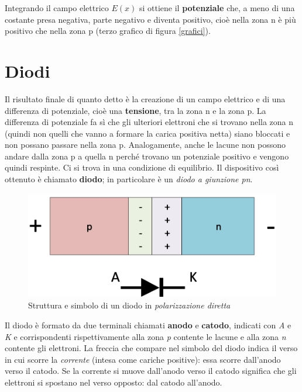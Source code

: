 \documentclass[12pt, a4paper]{report}
\begin{document}
Integrando il campo elettrico $E(x)$ si ottiene il \textbf{potenziale} che, a meno di una costante presa negativa, parte negativo e diventa positivo, cioè nella zona n è più positivo che nella zona p (terzo grafico di figura \ref{grafici}).

\section{Diodi}
Il risultato finale di quanto detto è la creazione di un campo elettrico e di una differenza di potenziale, cioè una \textbf{tensione}, tra la zona n e la zona p. La differenza di potenziale fa sì che gli ulteriori elettroni che si trovano nella zona n (quindi non quelli che vanno a formare la carica positiva netta) siano bloccati e non possano passare nella zona p. Analogamente, anche le lacune non possono andare dalla zona p a quella n perché trovano un potenziale positivo e vengono quindi respinte. Ci si trova in una condizione di equilibrio. Il dispositivo così ottenuto è chiamato \textbf{diodo}; in particolare è un \textit{diodo a giunzione pn}.
\begin{figure}[h]
\centering
\includegraphics[scale=0.4,angle=0]{diodo.png}
\caption{Struttura e simbolo di un diodo in \textit{polarizzazione diretta}}
\end{figure}

Il diodo è formato da due terminali chiamati \textbf{anodo} e \textbf{catodo}, indicati con \textit{A} e \textit{K} e corrispondenti rispettivamente alla zona \textit{p} contente le lacune e alla zona \textit{n} contente gli elettroni. La freccia che compare nel simbolo del diodo indica il verso in cui scorre la \textit{corrente} (intesa come cariche positive): essa scorre dall'anodo verso il catodo. Se la corrente si muove dall'anodo verso il catodo significa che gli elettroni si spostano nel verso opposto: dal catodo all'anodo.
\end{document}
